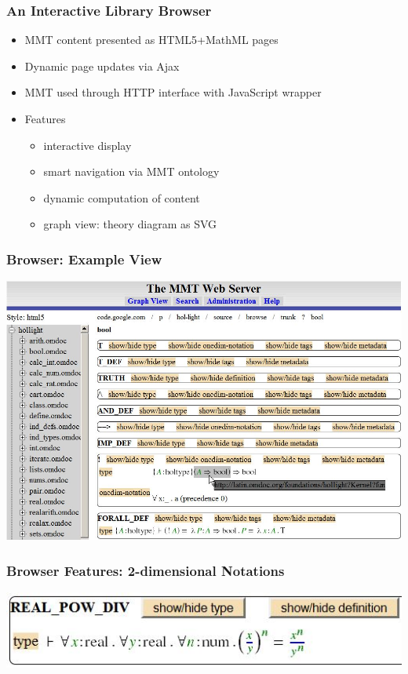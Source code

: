 \documentclass{beamer}
\begin{document}
\begin{frame}\frametitle{An Interactive Library Browser}
\begin{itemize}
\item MMT content presented as HTML5+MathML pages
\item Dynamic page updates via Ajax
\item MMT used through HTTP interface with JavaScript wrapper
\item Features
  \begin{itemize}
    \item interactive display
    \item smart navigation via MMT ontology
    \item dynamic computation of content
    \item graph view: theory diagram as SVG
  \end{itemize}
\end{itemize}
\end{frame}


\begin{frame}\frametitle{Browser: Example View}
\includegraphics[width=\textwidth]{img/browse.jpg}
\end{frame}

\begin{frame}\frametitle{Browser Features: 2-dimensional Notations}
\includegraphics[width=\textwidth]{img/2dnot.jpg}
\end{frame}
\end{document}
